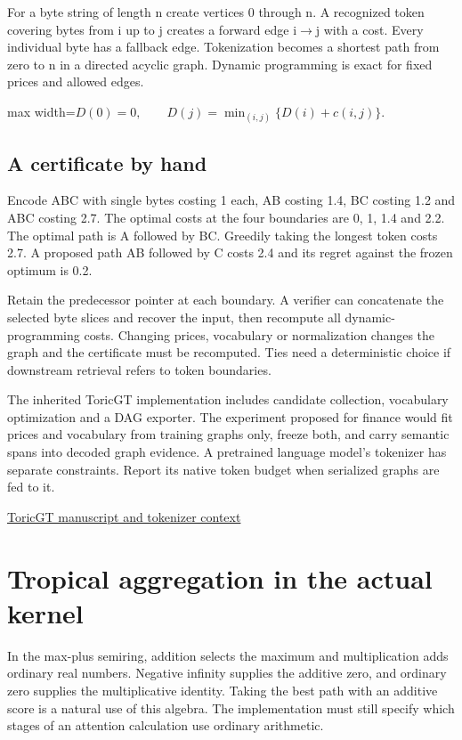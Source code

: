 \documentclass[11pt,oneside,openany]{book}
\begin{document}
For a byte string of length n create vertices 0 through n. A recognized token covering bytes from i up to j creates a forward edge i\ensuremath{\to}j with a cost. Every individual byte has a fallback edge. Tokenization becomes a shortest path from zero to n in a directed acyclic graph. Dynamic programming is exact for fixed prices and allowed edges.

\begin{center}\begin{adjustbox}{max width=\linewidth}$\displaystyle D(0)=0,\qquad D(j)=\min_{(i,j)}\{D(i)+c(i,j)\}.$\end{adjustbox}\end{center}
\section*{A certificate by hand}
Encode ABC with single bytes costing 1 each, AB costing 1.4, BC costing 1.2 and ABC costing 2.7. The optimal costs at the four boundaries are 0, 1, 1.4 and 2.2. The optimal path is A followed by BC. Greedily taking the longest token costs 2.7. A proposed path AB followed by C costs 2.4 and its regret against the frozen optimum is 0.2.

Retain the predecessor pointer at each boundary. A verifier can concatenate the selected byte slices and recover the input, then recompute all dynamic-programming costs. Changing prices, vocabulary or normalization changes the graph and the certificate must be recomputed. Ties need a deterministic choice if downstream retrieval refers to token boundaries.

The inherited ToricGT implementation includes candidate collection, vocabulary optimization and a DAG exporter. The experiment proposed for finance would fit prices and vocabulary from training graphs only, freeze both, and carry semantic spans into decoded graph evidence. A pretrained language model's tokenizer has separate constraints. Report its native token budget when serialized graphs are fed to it.

{\small\sffamily\href{https://github.com/amelie-iska/ToricGT/blob/oai-toricgt/assets/toricgt_neurips_condensed.tex}{ToricGT manuscript and tokenizer context}\par}
\chapter{Tropical aggregation in the actual kernel}
In the max-plus semiring, addition selects the maximum and multiplication adds ordinary real numbers. Negative infinity supplies the additive zero, and ordinary zero supplies the multiplicative identity. Taking the best path with an additive score is a natural use of this algebra. The implementation must still specify which stages of an attention calculation use ordinary arithmetic.
\end{document}
